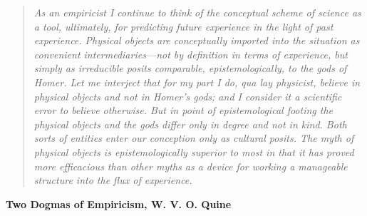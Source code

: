 \documentclass{article}
\theoremstyle{named}
\theoremstyle{remark}
\theoremstyle{definition}
\begin{document}


\clearpage

\thispagestyle{empty}
\null\vfill
\begin{quote}
    \itshape
    As an empiricist I continue to think of the conceptual scheme of science as a tool, ultimately, for predicting future experience
    in the light of past experience. Physical objects are conceptually imported into the situation as convenient intermediaries—not
    by definition in terms of experience, but simply as irreducible posits comparable, epistemologically, to the gods of Homer. 
    Let me interject that for my part I do, \textit{qua} lay physicist, believe in physical objects and not in Homer’s gods; and I
    consider it a scientific error to believe otherwise. But in point of epistemological footing the physical objects and the 
    gods differ only in degree and not in kind. Both sorts of entities enter our conception only as cultural posits. The myth of
    physical objects is epistemologically superior to most in that it has proved more efficacious than other myths as a device
    for working a manageable structure into the flux of experience.

    \end{quote}
    
    \begin{flushright}
    \textbf{Two Dogmas of Empiricism, W. V. O. Quine}
    \end{flushright}

\vfill\vfill

\clearpage
\end{document}
